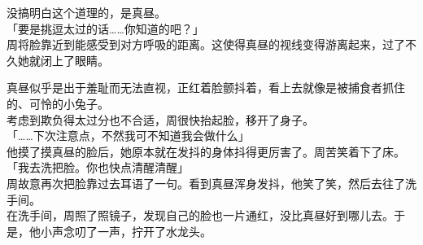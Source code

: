 没搞明白这个道理的，是真昼。\\

「要是挑逗太过的话……你知道的吧？」\\

周将脸靠近到能感受到对方呼吸的距离。这使得真昼的视线变得游离起来，过了不久她就闭上了眼睛。

真昼似乎是出于羞耻而无法直视，正红着脸颤抖着，看上去就像是被捕食者抓住的、可怜的小兔子。\\

考虑到欺负得太过分也不合适，周很快抬起脸，移开了身子。\\

「……下次注意点，不然我可不知道我会做什么」\\

他摸了摸真昼的脸后，她原本就在发抖的身体抖得更厉害了。周苦笑着下了床。\\

「我去洗把脸。你也快点清醒清醒」\\

周故意再次把脸靠过去耳语了一句。看到真昼浑身发抖，他笑了笑，然后去往了洗手间。\\

在洗手间，周照了照镜子，发现自己的脸也一片通红，没比真昼好到哪儿去。于是，他小声念叨了一声，拧开了水龙头。
